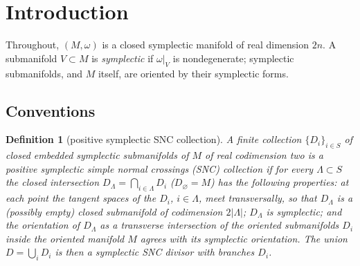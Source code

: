 \documentclass[11pt]{article}
\newtheorem{definition}[theorem]{Definition}
\theoremstyle{remark}
\begin{document}
\begin{abstract}
Let $(M,\omega)$ be a closed symplectic manifold and $D\subset M$ a
symplectic simple normal crossings divisor. After replacing $\omega$ by
a cohomologous symplectic form joined to it by a path along which $D$
stays simple normal crossings, we construct a tame almost complex
structure $J$ such that every point of $M$ has smooth complex
coordinates $(z_1,\dots,z_n)$ in which $z_1,\dots,z_r$ are
$J$-holomorphic and $D=\{z_1\cdots z_r=0\}$. The proof combines the
regularization theorem of Farajzadeh Tehrani, McLean and Zinger with
auxiliary approximately holomorphic divisors arranged in a forest of
binary trees, whose recursive frames give exact Laurent-monomial
transitions between nested systems of local defining functions, and
with a convexity property of tame structures that patches local
solutions exactly.
\end{abstract}

\section{Introduction}

Throughout, $(M,\omega)$ is a closed symplectic manifold of real
dimension $2n$. A submanifold $V\subset M$ is \emph{symplectic} if
$\omega|_V$ is nondegenerate; symplectic submanifolds, and $M$ itself,
are oriented by their symplectic forms.

\subsection*{Conventions}

\begin{definition}[positive symplectic SNC collection]\label{def:snc}
A finite collection $\{D_i\}_{i\in S}$ of closed embedded symplectic
submanifolds of $M$ of real codimension two is a \emph{positive
symplectic simple normal crossings (SNC) collection} if for every
$\Lambda\subset S$ the \emph{closed intersection}
$D_\Lambda=\bigcap_{i\in\Lambda}D_i$ ($D_\varnothing=M$) has the
following properties: at each point the tangent spaces of the $D_i$,
$i\in\Lambda$, meet transversally, so that $D_\Lambda$ is a (possibly
empty) closed submanifold of codimension $2|\Lambda|$; $D_\Lambda$ is
symplectic; and the orientation of $D_\Lambda$ as a transverse
intersection of the oriented
submanifolds $D_i$ inside the oriented manifold $M$ agrees with its
symplectic orientation. The union $D=\bigcup_iD_i$ is then a
\emph{symplectic SNC divisor} with \emph{branches} $D_i$.
\end{definition}
\end{document}
